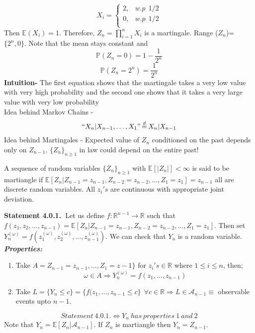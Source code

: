 \documentclass[main]{subfiles}
\begin{document}
\ex
\begin{equation*}
  X_i=
  \begin{cases}
    2 , & w.p ~~ 1/2 \\
    0 , & w.p ~~1/2  \\
  \end{cases}
\end{equation*}
Then $\mathbb{E} (X_i)=1$. Therefore, $Z_n= \prod_{i=1}^n X_i$ is a martingale. Range ($Z_n$)= $\{2^n,0\}$. Note that the mean stays constant and
$$\mathbb{P}(Z_n=0)=1-\frac{1}{2^n}$$
$$\mathbb{P}(Z_n=2^n)=\frac{1}{2^n}$$
\textbf{Intuition-} The first equation shows that the martingale takes a very low value with very high probability and the second one shows that it takes a very large value with very low probability\\
Idea behind Markov Chains -
$$``X_n | X_{n-1}, \ldots, X_1" \,{\buildrel d \over =}\, X_n|X_{n-1}$$
Idea behind Martingales -
Expected value of $Z_n$ conditioned on the past depends only on $Z_{n-1}$. $\{Z_n\}_{n \geq 1}$ in law could depend on the entire past!


\begin{definition}
    A sequence of random variables $\{Z_n\}_{n \geq 1}$ with $\mathbb{E}[|Z_n|] < \infty$ is said to be martiangle if $\mathbb{E}[Z_n | Z_{n-1}=z_{n-1} , Z_{n-2}=z_{n-2}, . . . , Z_1=z_1] = z_{n-1}$ all are discrete random variables. All $z_i's$ are continuous with appropriate joint deviation.
\end{definition}

\textbf{Statement 4.0.1.\ }Let us define $f : \mathbb{R}^{n-1} \rightarrow \mathbb{R}$ such that $f(z_1, z_2,..., z_{n-1}) = \mathbb{E}[Z_n | Z_{n-1}=z_{n-1} , Z_{n-2}=z_{n-2}, . . . , Z_1=z_1]$.
Then set $Y_n^{(\omega)} = f(z_1^{(\omega)}, z_2^{(\omega)},..., z_{n-1}^{(\omega)})$. We can check that $Y_n$ is a random variable.\\

\emph{\textbf{Properties:}}
\begin{enumerate}
    \item 
    Take $A = Z_{n-1}=z_{n-1},..., Z_1=z-1\}$ for $z_i's \in \mathbb{R}$ where $1 \leq i \leq n$, then;
    \[\omega \in A \Rightarrow Y_n^{(\omega)} = f(z_1,..., z_{n-1})\]
    \item
    Take $L = \{Y_n \leq c\} = \{f(z_1,..., z_{n-1} \leq c\} \ \  \forall c \in \mathbb{R} \Rightarrow L \in \mathcal{A}_{n-1} \equiv$ observable events upto $n-1$.
\end{enumerate}
\[{Statement \  4.0.1.} \iff Y_n \ has \ properties \ 1 \ and \  2\]
Note that $Y_n = \mathbb{E}[Z_n | \mathcal{A}_{n-1}]$. If $Z_n$ is martiangle then $Y_n = Z_{n-1}$.\\
\end{document}
